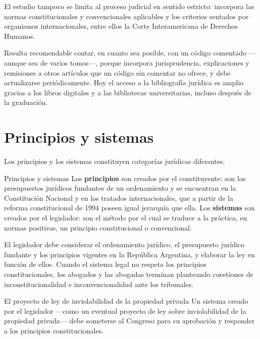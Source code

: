\documentclass[12pt,oneside]{book}
\begin{document}
El estudio tampoco se limita al proceso judicial en sentido estricto: incorpora las normas constitucionales y convencionales aplicables y los criterios sentados por organismos internacionales, entre ellos la Corte Interamericana de Derechos Humanos.

\begin{note}
Resulta recomendable contar, en cuanto sea posible, con un código comentado ---aunque sea de varios tomos---, porque incorpora jurisprudencia, explicaciones y remisiones a otros artículos que un código sin comentar no ofrece, y debe actualizarse periódicamente. Hoy el acceso a la bibliografía jurídica es amplio gracias a los libros digitales y a las bibliotecas universitarias, incluso después de la graduación.
\end{note}

\section{Principios y sistemas}\label{sec:principios-sistemas}

Los principios y los sistemas constituyen categorías jurídicas diferentes.

\begin{definition}{Principios y sistemas}
Los \textbf{principios} son creados por el constituyente: son los presupuestos jurídicos fundantes de un ordenamiento y se encuentran en la Constitución Nacional y en los tratados internacionales, que a partir de la reforma constitucional de 1994 poseen igual jerarquía que ella. Los \textbf{sistemas} son creados por el legislador: son el método por el cual se traduce a la práctica, en normas positivas, un principio constitucional o convencional.
\end{definition}

El legislador debe considerar el ordenamiento jurídico, el presupuesto jurídico fundante y los principios vigentes en la República Argentina, y elaborar la ley en función de ellos. Cuando el sistema legal no respeta los principios constitucionales, los abogados y las abogadas terminan planteando cuestiones de inconstitucionalidad e inconvencionalidad ante los tribunales.

\begin{example}{El proyecto de ley de inviolabilidad de la propiedad privada}
Un sistema creado por el legislador ---como un eventual proyecto de ley sobre inviolabilidad de la propiedad privada--- debe someterse al Congreso para su aprobación y responder a los principios constitucionales.
\end{example}
\end{document}
